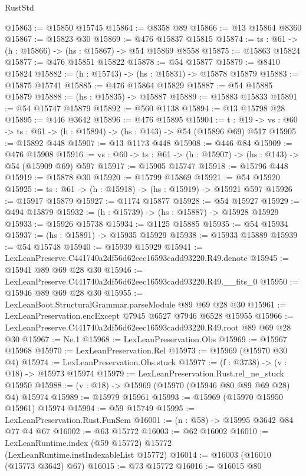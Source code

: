 \begin{lexlean}{RustStd}
\begin{coremodule}
@15863 := @15850 @15745
@15864 := @8358 @89
@15866 := @13 @15864 @8360
@15867 := @15823 @30
@15869 := @476 @15837 @15815
@15874 := {ts : @61} -> (h : @15866) -> (hs : @15867) -> @54 @15869 @8558
@15875 := @15863 @15824
@15877 := @476 @15851 @15822
@15878 := @54 @15877
@15879 := @8410 @15824
@15882 := (h : @15743) -> (hs : @15831) -> @15878 @15879
@15883 := @15875 @15741
@15885 := @476 @15864 @15829
@15887 := @54 @15885 @15879
@15888 := (hs : @15835) -> @15887
@15889 := @15883 @15833
@15891 := @54 @15747 @15879
@15892 := @560 @1138
@15894 := @13 @15798 @28
@15895 := @446 @3642
@15896 := @476 @15895
@15904 := {t : @19} ->
  {vs : @60} -> {ts : @61} -> (h : @15894) -> (hs : @143) -> @54 (@15896 @69) @517
@15905 := @15892 @448
@15907 := @13 @1173 @448
@15908 := @446 @84
@15909 := @476 @15908
@15916 := {vs : @60} -> {ts : @61} -> (h : @15907) -> (hs : @143) -> @54 (@15909 @69) @597
@15917 := @15905 @15747
@15918 := @15796 @448
@15919 := @15878 @30
@15920 := @15799 @15869
@15921 := @54 @15920
@15925 := {ts : @61} -> (h : @15918) -> (hs : @15919) -> @15921 @597
@15926 := @15917 @15879
@15927 := @1174 @15877
@15928 := @54 @15927
@15929 := @494 @15879
@15932 := (h : @15739) -> (hs : @15887) -> @15928 @15929
@15933 := @15926 @15738
@15934 := @1125 @15885
@15935 := @54 @15934
@15937 := (hs : @15891) -> @15935 @15929
@15938 := @15933 @15889
@15939 := @54 @15748
@15940 := @15939 @15929
@15941 := LexLeanPreserve.C441740a2df56d62eec16593cadd93220.R49.denote
@15945 := @15941 @89 @69 @28 @30
@15946 := LexLeanPreserve.C441740a2df56d62eec16593cadd93220.R49.__fits_0
@15950 := @15946 @89 @69 @28 @30
@15955 := LexLeanBoot.StructuralGrammar.parseModule @89 @69 @28 @30
@15961 := LexLeanPreservation.encExcept @7945 @6527 @7946 @6528 @15955
@15966 := LexLeanPreserve.C441740a2df56d62eec16593cadd93220.R49.root @89 @69 @28 @30
@15967 := Ne.{1}
@15968 := LexLeanPreservation.Obs
@15969 := @15967 @15968
@15970 := LexLeanPreservation.Rel
@15973 := @15969 (@15970 @30 @4)
@15974 := LexLeanPreservation.Obs.stuck
@15977 := (f : @3738) -> (v : @18) -> @15973 @15974
@15979 := LexLeanPreservation.Rust.rel_ne_stuck @15950
@15988 := (v : @18) -> @15969 (@15970 (@15946 @80 @89 @69 @28) @4) @15974
@15989 := @15979 @15961
@15993 := @15969 (@15970 @15950 @15961) @15974
@15994 := @59 @15749
@15995 := LexLeanPreservation.Rust.FunSem
@16001 := (n : @58) -> @15995 @3642 @84 @77 @4 @67
@16002 := @63 @15772
@16003 := @62 @16002
@16010 := LexLeanRuntime.index (@59 @15772) @15772 (LexLeanRuntime.instIndexableList @15772)
@16014 := @16003 (@16010 (@15773 @3642) @67)
@16015 := @73 @15772
@16016 := @16015 @80

\end{coremodule}
\end{lexlean}
